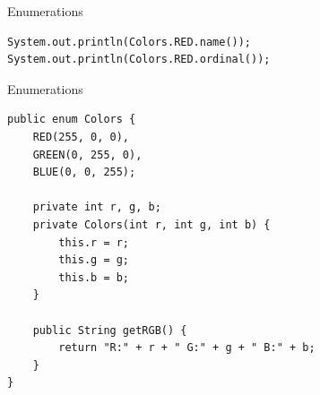 \begin{frame}[fragile]{Enumerations}
\begin{lstlisting}
System.out.println(Colors.RED.name());
System.out.println(Colors.RED.ordinal());
\end{lstlisting}
\end{frame}

\begin{frame}[fragile]{Enumerations}
\begin{lstlisting}
public enum Colors {
	RED(255, 0, 0),
	GREEN(0, 255, 0),
	BLUE(0, 0, 255);
	
	private int r, g, b;
	private Colors(int r, int g, int b) {
		this.r = r;
		this.g = g;
		this.b = b;
	}
	
	public String getRGB() {
		return "R:" + r + " G:" + g + " B:" + b;
	}
}
\end{lstlisting}
\end{frame}

